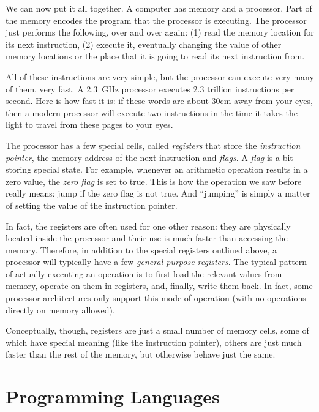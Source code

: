 \medskip

We can now put it all together. A computer has memory and a processor. Part of
the memory encodes the program that the processor is executing. The processor
just performs the following, over and over again: (1) read the memory location
for its next instruction, (2) execute it, eventually changing the value of
other memory locations or the place that it is going to read its next
instruction from.

All of these instructions are very simple, but the processor can execute very
many of them, very fast. A 2.3~GHz processor executes 2.3 trillion instructions
per second. Here is how fast it is: if these words are about 30cm away from
your eyes, then a modern processor will execute two instructions in the time it
takes the light to travel from these pages to your eyes. %

The processor has a few special cells, called \emph{registers} that store the
\emph{instruction pointer}, the memory address of the next instruction and
\emph{flags}. A \emph{flag} is a bit storing special state. For example,
whenever an arithmetic operation results in a zero value, the \emph{zero flag}
is set to true. This is how the  operation we saw before
really means: jump if the zero flag is not true. And ``jumping'' is simply a
matter of setting the value of the instruction pointer.

In fact, the registers are often used for one other reason: they are physically
located inside the processor and their use is much faster than accessing the
memory. Therefore, in addition to the special registers outlined above, a
processor will typically have a few \emph{general purpose registers}. The
typical pattern of actually executing an operation is to first load the
relevant values from memory, operate on them in registers, and, finally, write
them back. In fact, some processor architectures only support this mode of
operation (with no operations directly on memory allowed).

Conceptually, though, registers are just a small number of memory cells, some
of which have special meaning (like the instruction pointer), others are just
much faster than the rest of the memory, but otherwise behave just the same.

\section{Programming Languages}

